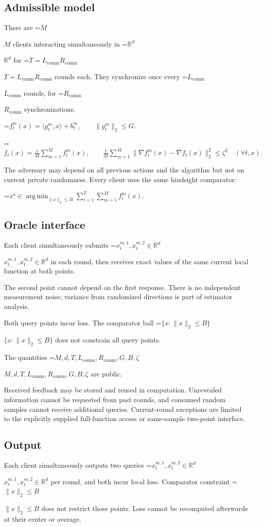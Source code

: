 \documentclass[10pt,a4paper]{article}
\newcommand{\AtlasMath}[1]{\par\begingroup\centering\setbox0=\hbox{$\displaystyle #1$}\ifdim\wd0>1.4\linewidth\typeout{ATLAS WIDE FORMULA: \the\wd0}\fi\ifdim\wd0>\linewidth\resizebox{\linewidth}{!}{\box0}\else\box0\fi\par\endgroup}
\newcommand{\AtlasInlineMath}[1]{\begingroup\setbox0=\hbox{$#1$}\ifdim\wd0>.4\linewidth\endgroup\AtlasMath{#1}\else\endgroup$#1$\fi}
\begin{document}
\subsection{Admissible model}
There are \AtlasInlineMath{M} clients interacting simultaneously in \AtlasInlineMath{\mathbb{R}^d} for \AtlasInlineMath{T=L_{\mathrm{comm}}R_{\mathrm{comm}}} rounds each. They synchronize once every \AtlasInlineMath{L_{\mathrm{comm}}} rounds, for \AtlasInlineMath{R_{\mathrm{comm}}} synchronizations.


\AtlasMath{f_t^m(x)=\langle g_t^m,x\rangle+b_t^m,\qquad \|g_t^m\|_2\le G.}



\AtlasMath{f_t(x)=\frac1M\sum_{m=1}^{M}f_t^m(x),\qquad \frac1M\sum_{m=1}^{M}\|\nabla f_t^m(x)-\nabla f_t(x)\|_2^2\le\zeta^2\quad(\forall t,x).}


The adversary may depend on all previous actions and the algorithm but not on current private randomness. Every client uses the same hindsight comparator:


\AtlasMath{x^\star\in\operatorname*{arg\,min}_{\|x\|_2\le B}\sum_{t=1}^{T}\sum_{m=1}^{M}f_t^m(x).}


\subsection{Oracle interface}
Each client simultaneously submits \AtlasInlineMath{x_t^{m,1},x_t^{m,2}\in\mathbb{R}^d} in each round, then receives exact values of the same current local function at both points.

The second point cannot depend on the first response. There is no independent measurement noise; variance from randomized directions is part of estimator analysis.

Both query points incur loss. The comparator ball \AtlasInlineMath{\{x:\|x\|_2\le B\}} does not constrain all query points.

The quantities \AtlasInlineMath{M,d,T,L_{\mathrm{comm}},R_{\mathrm{comm}},G,B,\zeta} are public.

Received feedback may be stored and reused in computation. Unrevealed information cannot be requested from past rounds, and consumed random samples cannot receive additional queries. Current-round exceptions are limited to the explicitly supplied full-function access or same-sample two-point interface.

\subsection{Output}
Each client simultaneously outputs two queries \AtlasInlineMath{x_t^{m,1},x_t^{m,2}\in\mathbb{R}^d} per round, and both incur local loss. Comparator constraint \AtlasInlineMath{\|x\|_2\le B} does not restrict those points. Loss cannot be recomputed afterwards at their center or average.
\end{document}
